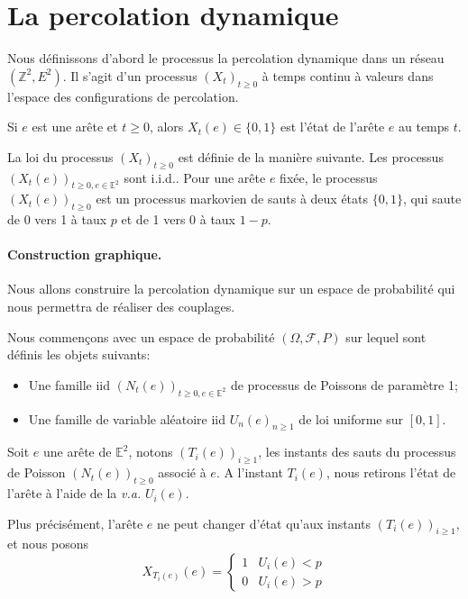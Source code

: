 \documentclass[titlepage,a4paper,12pt]{article}
\begin{document}
\section{La percolation dynamique}
Nous définissons d'abord le processus la percolation dynamique dans un réseau $(\mathbb{Z}^2,E^2)$. 
Il s'agit d'un processus $(X_t)_{t\geqslant 0}$ à temps continu à valeurs dans l'espace des configurations de percolation. 

Si $e$ est une arête et $t\geqslant 0$, alors $X_t(e)\in \{0,1\}$ est l'état de l'arête $e$ au temps $t$.

La loi du processus $(X_t)_{t\geqslant 0}$ est définie de la manière suivante. Les processus $(X_t(e))_{t\geqslant 0,e\in\mathbb{E}^2}$ sont i.i.d.. Pour une arête $e$ fixée, le processus $(X_t(e))_{t\geqslant 0}$ est un processus markovien de sauts à deux états $\{0,1\}$, qui saute de 0 vers 1 à taux $p$ et de 1 vers 0 à taux $1-p$.

\paragraph{Construction graphique.} Nous allons construire la percolation dynamique sur un espace de probabilité qui nous permettra de réaliser des couplages.

Nous commençons avec un espace de probabilité $(\Omega, \mathcal{F},P)$ sur lequel sont définis les objets suivants:

\begin{itemize}[label = $\bullet$, leftmargin = *]
\item Une famille iid $(N_t(e))_{t\geqslant 0, e \in \mathbb{E}^2}$ de processus de Poissons de paramètre 1;
\item Une famille de variable aléatoire iid $U_n(e)_{n\geqslant 1}$ de loi uniforme sur $[0,1]$.
\end{itemize} 


Soit $e$ une arête de $\mathbb{E}^2$, notons $(T_i(e))_{i\geqslant 1}$, les instants des sauts du processus de Poisson $(N_t(e))_{t\geqslant 0}$ associé à $e$. A l'instant $T_i(e)$, nous retirons l'état de l'arête à l'aide de la \textit{v.a.} $U_i(e)$.

Plus précisément, l'arête $e$ ne peut changer d'état qu'aux instants $(T_i(e))_{i\geqslant 1}$, et nous posons 
$$ X_{T_i(e)}(e) = \left\lbrace \begin{array}{cc}
1 & U_i(e) < p \\
0 & U_i(e) > p
\end{array}
\right.
$$
\end{document}
